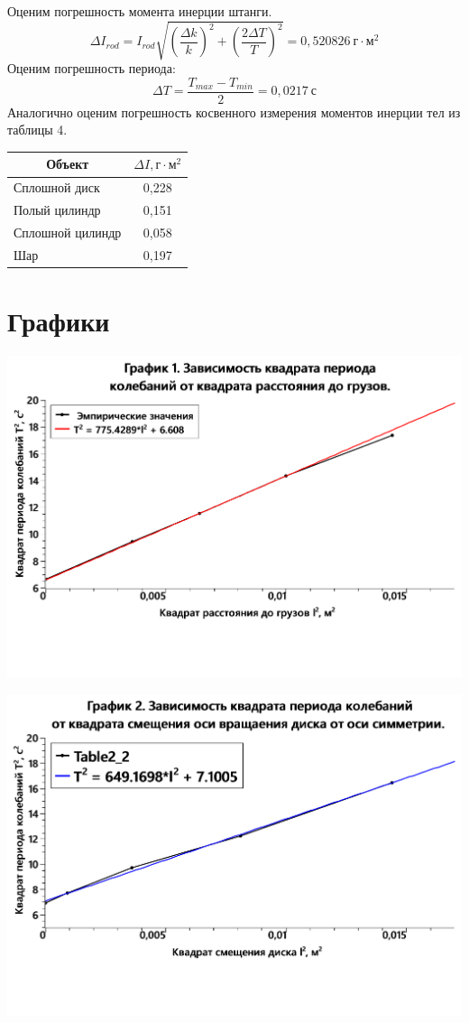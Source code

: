 \documentclass[a4paper,14pt]{article}
\begin{document}
Оценим погрешность момента инерции штанги.
\[\Delta I_{rod} = I_{rod}\sqrt{\left(\frac{\Delta k}{k}\right)^2 + \left(\frac{2\Delta T}{T}\right)^2} = 0,520826 \ \text{г}\cdot\text{м}^2\]
Оценим погрешность периода:
\[\Delta T = \frac{T_{max} - T_{min}}{2} = 0,0217 \ \text{с}\]
Аналогично оценим погрешность косвенного измерения моментов инерции тел из таблицы 4.

\begin{center}
	\begin{tabular}{|l|c|}
		\hline
		\multicolumn{1}{|c|}{Объект } & $\Delta I, \text{г}\cdot\text{м}^2$ \bigstrut\\
		\hline
		Сплошной диск & 0,228 \bigstrut\\
		\hline
		Полый цилиндр & 0,151 \bigstrut\\
		\hline
		Сплошной цилиндр & 0,058 \bigstrut\\
		\hline
		Шар   & 0,197 \bigstrut\\
		\hline
	\end{tabular}%
\end{center}

\section{Графики}

\begin{center}
	\includegraphics[width=0.8\linewidth]{./picture1}
\end{center}

\begin{center}
	\includegraphics[width=0.8\linewidth]{./picture2}
\end{center}
\end{document}

